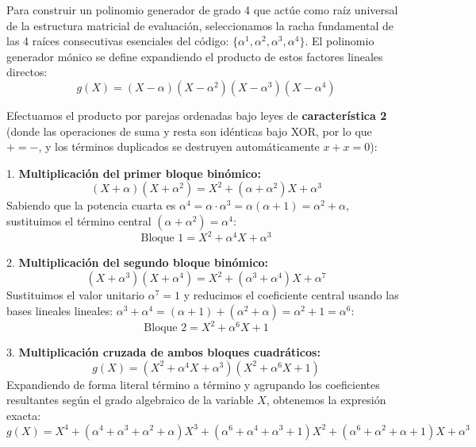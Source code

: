 \documentclass{article}
\begin{document}
Para construir un polinomio generador de grado 4 que actúe como raíz universal de la estructura matricial de evaluación, seleccionamos la racha fundamental de las 4 raíces consecutivas esenciales del código: $\{\alpha^1, \alpha^2, \alpha^3, \alpha^4\}$. El polinomio generador mónico se define expandiendo el producto de estos factores lineales directos:
\[ g(X) = (X - \alpha)(X - \alpha^2)(X - \alpha^3)(X - \alpha^4) \]

Efectuamos el producto por parejas ordenadas bajo leyes de \textbf{característica 2} (donde las operaciones de suma y resta son idénticas bajo XOR, por lo que $+ = -$, y los términos duplicados se destruyen automáticamente $x + x = 0$):

1. \textbf{Multiplicación del primer bloque binómico:}
   \[ (X + \alpha)(X + \alpha^2) = X^2 + (\alpha + \alpha^2)X + \alpha^3 \]
   Sabiendo que la potencia cuarta es $\alpha^4 = \alpha \cdot \alpha^3 = \alpha(\alpha + 1) = \alpha^2 + \alpha$, sustituimos el término central $(\alpha + \alpha^2) = \alpha^4$:
   \[ \text{Bloque 1} = X^2 + \alpha^4X + \alpha^3 \]

2. \textbf{Multiplicación del segundo bloque binómico:}
   \[ (X + \alpha^3)(X + \alpha^4) = X^2 + (\alpha^3 + \alpha^4)X + \alpha^7 \]
   Sustituimos el valor unitario $\alpha^7 = 1$ y reducimos el coeficiente central usando las bases lineales lineales: $\alpha^3 + \alpha^4 = (\alpha + 1) + (\alpha^2 + \alpha) = \alpha^2 + 1 = \alpha^6$:
   \[ \text{Bloque 2} = X^2 + \alpha^6X + 1 \]

3. \textbf{Multiplicación cruzada de ambos bloques cuadráticos:}
   \[ g(X) = (X^2 + \alpha^4X + \alpha^3)(X^2 + \alpha^6X + 1) \]
   Expandiendo de forma literal término a término y agrupando los coeficientes resultantes según el grado algebraico de la variable $X$, obtenemos la expresión exacta:
   \[ g(X) = X^4 + (\alpha^4 + \alpha^3 + \alpha^2 + \alpha)X^3 + (\alpha^6 + \alpha^4 + \alpha^3 + 1)X^2 + (\alpha^6 + \alpha^2 + \alpha + 1)X + \alpha^3 \]
\end{document}
